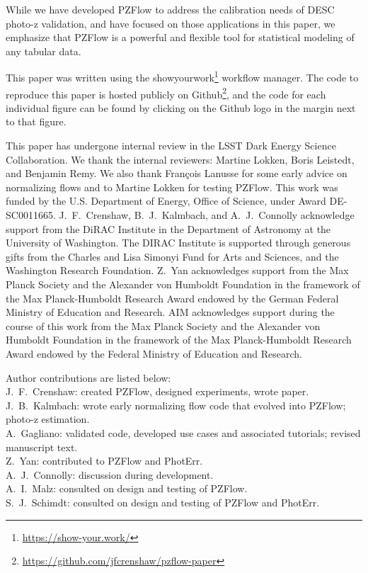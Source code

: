 \documentclass[twocolumn,twocolappendix]{aastex631}
\begin{document}
While we have developed PZFlow to address the calibration needs of DESC photo-z validation, and have focused on those applications in this paper, we emphasize that PZFlow is a powerful and flexible tool for statistical modeling of any tabular data.

This paper was written using the showyourwork\footnote{\url{https://show-your.work/}} workflow manager.
The code to reproduce this paper is hosted publicly on Github\footnote{\url{https://github.com/jfcrenshaw/pzflow-paper}}, and the code for each individual figure can be found by clicking on the Github logo in the margin next to that figure.

\begin{acknowledgements}
    This paper has undergone internal review in the LSST Dark Energy Science Collaboration.
    We thank the internal reviewers: Martine Lokken, Boris Leistedt, and Benjamin Remy.
    We also thank François Lanusse for some early advice on normalizing flows and to Martine Lokken for testing PZFlow.
    This work was funded by the U.S. Department of Energy, Office of Science, under Award DE-SC0011665.
    J.~F.~Crenshaw, B.~J.~Kalmbach, and A.~J.~Connolly acknowledge support from the DiRAC Institute in the Department of Astronomy at the University of Washington.
    The DIRAC Institute is supported through generous gifts from the Charles and Lisa Simonyi Fund for Arts and Sciences, and the Washington Research Foundation.
    Z.~Yan acknowledges support from the Max Planck Society and the Alexander von Humboldt Foundation in the framework of the Max Planck-Humboldt Research Award endowed by the German Federal Ministry of Education and Research.
    AIM acknowledges support during the course of this work from the Max Planck Society and the Alexander von Humboldt Foundation in the framework of the Max Planck-Humboldt Research Award endowed by the Federal Ministry of Education and Research.

    Author contributions are listed below: \\
    J.~F.~Crenshaw: created PZFlow, designed experiments, wrote paper. \\
    J.~B.~Kalmbach: wrote early normalizing flow code that evolved into PZFlow; photo-z estimation. \\
    A.~Gagliano: validated code, developed use cases and associated tutorials; revised manuscript text. \\
    Z.~Yan: contributed to PZFlow and PhotErr. \\
    A.~J.~Connolly: discussion during development. \\
    A.~I.~Malz: consulted on design and testing of PZFlow. \\
    S.~J.~Schimdt: consulted on design and testing of PZFlow and PhotErr. \\
\end{acknowledgements}
\end{document}

